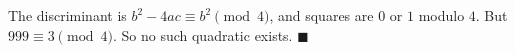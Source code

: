 The discriminant is $b^2-4ac\equiv b^2\pmod4$, and squares are $0$ or $1$ modulo $4$. But $999\equiv3\pmod4$. So no such quadratic exists. $\blacksquare$
